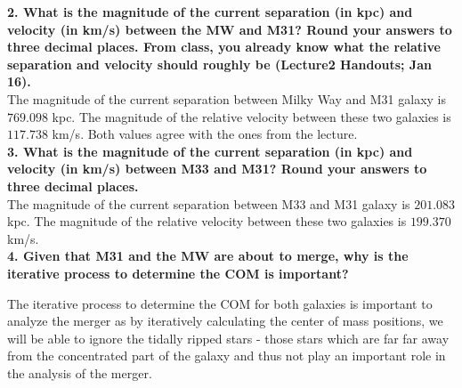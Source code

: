 \documentclass{article}
\begin{document}
\noindent \textbf{2. What is the magnitude of the current separation (in kpc) and velocity (in km/s) between the MW and M31? Round your answers to three decimal places. From class,
you already know what the relative separation and velocity should roughly be (Lecture2
Handouts; Jan 16).} \\

\noindent The magnitude of the current separation between Milky Way and M31 galaxy is $769.098$ kpc. The magnitude of the relative velocity between these two galaxies is $117.738$ km/s. Both values agree with the ones from the lecture.\\

\noindent \textbf{3. What is the magnitude of the current separation (in kpc) and velocity (in km/s) between M33 and M31? Round your answers to three decimal places.}	 \\

\noindent The magnitude of the current separation between M33 and M31 galaxy is $201.083$ kpc. The magnitude of the relative velocity between these two galaxies is $199.370$ km/s.\\

\noindent \textbf{4. Given that M31 and the MW are about to merge, why is the iterative process to determine the COM is important?}	 

\noindent The iterative process to determine the COM for both galaxies is important to analyze the merger as by iteratively calculating the center of mass positions, we will be able to ignore the tidally ripped stars - those stars which are far far away from the concentrated part of the galaxy and thus not play an important role in the analysis of the merger. 
\end{document}
